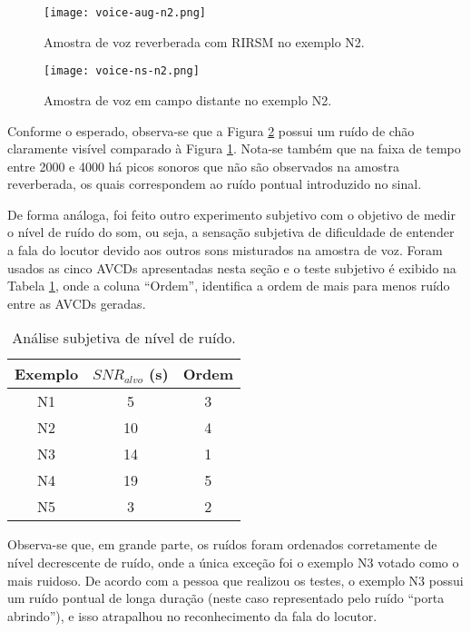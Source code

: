 \begin{figure} [H]
    \centering
    \texttt{[image: voice-aug-n2.png]}
    \caption{Amostra de voz reverberada com RIRSM no exemplo N2.}
    \label{fig:voice-aug-n2}
\end{figure} 

\begin{figure} [H]
    \centering
    \texttt{[image: voice-ns-n2.png]}
    \caption{Amostra de voz em campo distante no exemplo N2.}
    \label{fig:voice-ns-n2}
\end{figure} 

Conforme o esperado, observa-se que a Figura \ref{fig:voice-ns-n2} possui um ruído de chão claramente visível comparado à Figura \ref{fig:voice-aug-n2}.
Nota-se também que na faixa de tempo entre 2000 e 4000 há picos sonoros que não são observados na amostra reverberada, os quais correspondem ao ruído pontual
introduzido no sinal.

De forma análoga, foi feito outro experimento subjetivo com o objetivo de medir o nível de ruído do som, ou seja, 
a sensação subjetiva de dificuldade de entender a fala do locutor devido aos outros sons misturados na amostra de voz.
Foram usados as cinco AVCDs apresentadas nesta seção e o teste subjetivo é exibido na Tabela \ref{tbl:noise-exp}, onde
a coluna “Ordem”, identifica a ordem de mais para menos ruído entre as AVCDs geradas.

\begin{table} [H]
    \centering
    \caption{Análise subjetiva de nível de ruído.}
    \label{tbl:noise-exp}
    \begin{tabular}{c|c|c}

        \textbf{Exemplo} & 
        \textbf{$SNR_{alvo}$ (s)} & 
        \textbf{Ordem} \\
        \hline 

        N1 &  5 & 3 \\
        N2 & 10 & 4 \\
        N3 & 14 & 1 \\
        N4 & 19 & 5 \\
        N5 &  3 & 2 \\

    \end{tabular}
\end{table}

Observa-se que, em grande parte, os ruídos foram ordenados corretamente de nível decrescente de ruído, onde a única exceção foi o exemplo N3 votado como 
o mais ruidoso. De acordo com a pessoa que realizou os testes, o exemplo N3 possui um ruído pontual
de longa duração (neste caso representado pelo ruído “porta abrindo”), e isso atrapalhou no reconhecimento da fala do locutor.
